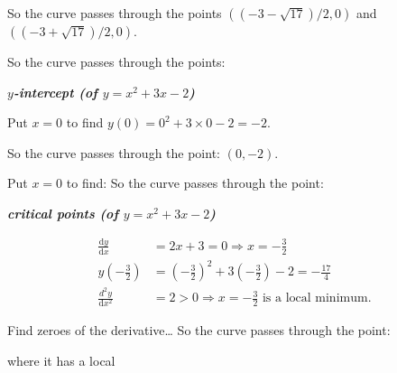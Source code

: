 \documentclass[
  11pt,
  oneside]{book}
\newcommand{\slide}{}
\theoremstyle{definition}
\theoremstyle{definition}
\theoremstyle{definition}
\theoremstyle{definition}
\theoremstyle{remark}
\begin{document}
\begin{notslides}

So the curve passes through the points \(((-3-\sqrt{17})/2,0)\) and \(((-3+\sqrt{17})/2,0)\).

\end{notslides}

\begin{slidesonly}

So the curve passes through the points:

\end{slidesonly}

\slide

\textbf{\emph{\(y\)-intercept (of \(y = x^2+3x-2\))}}

\begin{notslides}

Put \(x=0\) to find \(y(0) = 0^2+3\times0-2 = -2\).

So the curve passes through the point: \((0,-2)\).

\end{notslides}

\begin{slidesonly}

Put \(x=0\) to find:
\vfill
So the curve passes through the point:

\end{slidesonly}

\slide

\textbf{\emph{critical points (of \(y = x^2+3x-2\))}}

\begin{notslides}

\begin{align*}
\frac{\mathrm{d} y}{\mathrm{d} x} &= 2x+3 = 0 \Rightarrow x = -\frac{3}{2}\\
y(-\frac32) &= \left(-\frac32\right)^2 +3\left(-\frac 32\right) - 2 = -\frac{17}4\\
\frac{d^2y}{\mathrm{d} x^2} &= 2>0\Rightarrow x=-\frac 32\text{ is a local minimum}.
\end{align*}

\end{notslides}

\begin{slidesonly}

Find zeroes of the derivative\ldots{}
\vfill
So the curve passes through the point:

where it has a local

\end{slidesonly}
\end{document}
